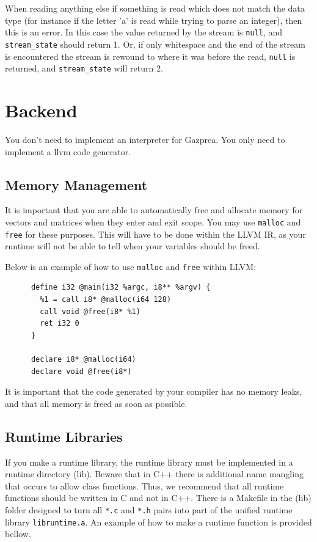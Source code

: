 \documentclass{article}
\begin{document}
    When reading anything else if something is read which does not match the data type (for instance if the letter
    'a' is read while trying to parse an integer), then this is an error. In this case the value returned by the
    stream is \texttt{null}, and \texttt{stream\_state} should return 1. Or, if only whitespace and the end of the
    stream is encountered the stream is rewound to where it was before the read, \texttt{null} is returned, and
    \texttt{stream\_state} will return 2.


\section{Backend}

  You don't need to implement an interpreter for Gazprea. You only need to implement a llvm code generator.

  \subsection{Memory Management}\label{sec:memory}
     It is important that you are able to automatically free and allocate memory for vectors and matrices when they enter and exit scope.
     You may use \texttt{malloc} and \texttt{free} for these purposes. This will have to be done within the LLVM IR, as your runtime will
     not be able to tell when your variables should be freed.

     Below is an example of how to use \texttt{malloc} and \texttt{free} within LLVM:

     \begin{lstlisting}
      define i32 @main(i32 %argc, i8** %argv) {
        %1 = call i8* @malloc(i64 128)
        call void @free(i8* %1)
        ret i32 0
      }

      declare i8* @malloc(i64)
      declare void @free(i8*)
    \end{lstlisting}
    It is important that the code generated by your compiler has no memory leaks, and that all memory is freed as soon as possible.

  \subsection{Runtime Libraries} %

    If you make a runtime library, the runtime library must be implemented in a runtime directory (lib). Beware that in C++ there is additional name
    mangling that occurs to allow class functions. Thus, we recommend that all runtime functions should be written in C and not in C++. There is a
    Makefile in the (lib) folder designed to turn all \texttt{*.c} and \texttt{*.h} pairs into part of the unified runtime library
    \texttt{libruntime.a}. An example of how to make a runtime function is provided bellow.
\end{document}
